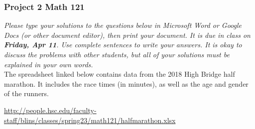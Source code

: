 \documentclass[12pt]{exam}
\begin{document}
\subsubsection*{Project 2 \hfill Math 121}

\textit{Please type your solutions to the questions below in Microsoft Word or Google Docs (or other document editor), then print your document. It is due in class on \textbf{Friday, Apr 11}. Use complete sentences to write your answers. It is okay to discuss the problems with other students, but all of your solutions must be explained in your own words. } \\

\noindent
The spreadsheet linked below contains data from the 2018 High Bridge half marathon. It includes the race times (in minutes), as well as the age and gender of the runners.   


\begin{center}
\url{http://people.hsc.edu/faculty-staff/blins/classes/spring23/math121/halfmarathon.xlsx}  
\end{center}
\end{document}
